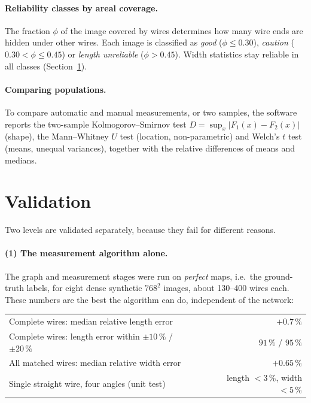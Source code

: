 \documentclass[11pt,a4paper]{article}
\begin{document}
\paragraph{Reliability classes by areal coverage.} The fraction $\phi$ of the image covered by wires determines how many wire ends are hidden under other wires. Each image is classified as \emph{good} ($\phi\le0.30$), \emph{caution} ($0.30<\phi\le0.45$) or \emph{length unreliable} ($\phi>0.45$). Width statistics stay reliable in all classes (Section~\ref{sec:validation}).

\paragraph{Comparing populations.} To compare automatic and manual measurements, or two samples, the software reports the two-sample Kolmogorov--Smirnov test $D=\sup_x|F_1(x)-F_2(x)|$ (shape), the Mann--Whitney $U$ test (location, non-parametric) and Welch's $t$ test (means, unequal variances), together with the relative differences of means and medians.

\section{Validation}\label{sec:validation}
Two levels are validated separately, because they fail for different reasons.

\paragraph{(1) The measurement algorithm alone.} The graph and measurement stages were run on \emph{perfect} maps, i.e.\ the ground-truth labels, for eight dense synthetic $768^2$ images, about 130--400 wires each. These numbers are the best the algorithm can do, independent of the network:

\begin{table}[H]\centering\small
\begin{tabular}{@{}lr@{}}\toprule
Complete wires: median relative length error & $+0.7\,\%$\\
Complete wires: length error within $\pm10\,\%$ / $\pm20\,\%$ & $91\,\%$ / $95\,\%$\\
All matched wires: median relative width error & $+0.65\,\%$\\
Single straight wire, four angles (unit test) & length $<3\,\%$, width $<5\,\%$\\\bottomrule
\end{tabular}
\end{table}
\end{document}
